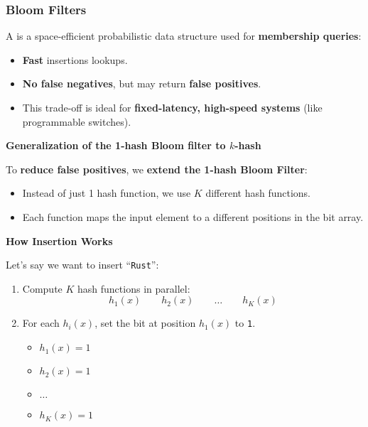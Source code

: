 \subsubsection{Bloom Filters}

A  is a space-efficient probabilistic data structure used for \textbf{membership queries}:
\begin{itemize}
    \item \textbf{Fast} insertions lookups.
    \item \textbf{No false negatives}, but may return \textbf{false positives}.
    \item This trade-off is ideal for \textbf{fixed-latency, high-speed systems} (like programmable switches).
\end{itemize}

\highspace
\begin{flushleft}
    \textcolor{Green3}{\faIcon{\speedIcon} \textbf{Generalization of the 1-hash Bloom filter to $k$-hash}}
\end{flushleft}
To \textcolor{Green3}{\textbf{reduce false positives}}, we \textbf{extend the 1-hash Bloom Filter}:
\begin{itemize}
    \item Instead of just 1 hash function, we use $K$ different hash functions.
    \item Each function maps the input element to a different positions in the bit array.
\end{itemize}

\highspace
\begin{flushleft}
    \textcolor{Green3}{ \textbf{How Insertion Works}}
\end{flushleft}
Let's say we want to insert ``\texttt{Rust}'':
\begin{enumerate}
    \item Compute $K$ hash functions in parallel:
    \begin{equation*}
        h_{1}\left(x\right) \hspace{2em} h_{2}\left(x\right) \hspace{2em} \dots \hspace{2em} h_{K}\left(x\right)
    \end{equation*}

    \item For each $h_{i}\left(x\right)$, set the bit at position $h_{1}\left(x\right)$ to \texttt{1}.
    \begin{itemize}
        \item $h_{1}\left(x\right) = 1$
        \item $h_{2}\left(x\right) = 1$
        \item $\dots$
        \item $h_{K}\left(x\right) = 1$
    \end{itemize}
\end{enumerate}

